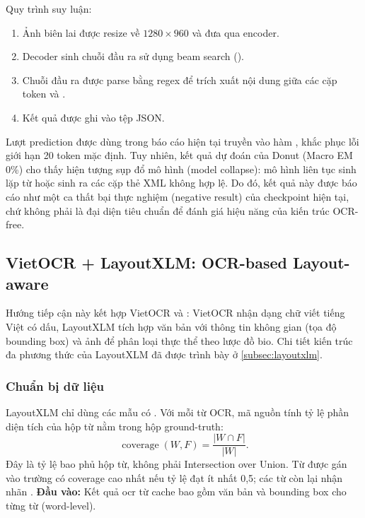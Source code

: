 Quy trình suy luận:
\begin{enumerate}
  \item Ảnh biên lai được resize về $1280 \times 960$ và đưa qua encoder.
  \item Decoder sinh chuỗi đầu ra sử dụng beam search
    ().
  \item Chuỗi đầu ra được parse bằng regex để trích xuất nội dung giữa
    các cặp token  và .
  \item Kết quả được ghi vào tệp JSON.
\end{enumerate}

\begin{warnbox}
Lượt prediction được dùng trong báo cáo hiện tại truyền  vào hàm , khắc phục lỗi giới hạn 20 token mặc định. Tuy nhiên, kết quả dự đoán của Donut (Macro EM 0\%) cho thấy hiện tượng sụp đổ mô hình (model collapse): mô hình liên tục sinh lặp từ hoặc sinh ra các cặp thẻ XML không hợp lệ. Do đó, kết quả này được báo cáo như một ca thất bại thực nghiệm (negative result) của checkpoint hiện tại, chứ không phải là đại diện tiêu chuẩn để đánh giá hiệu năng của kiến trúc OCR-free.
\end{warnbox}


\subsection{VietOCR + LayoutXLM: OCR-based Layout-aware}
\label{subsec:layoutxlm_methodology}


Hướng tiếp cận này kết hợp VietOCR và : VietOCR nhận dạng chữ viết tiếng Việt có dấu, LayoutXLM tích hợp văn bản với thông tin không gian (tọa độ bounding box) và ảnh để phân loại thực thể theo lược đồ \gls{bio}. Chi tiết kiến trúc đa phương thức của LayoutXLM đã được trình bày ở \cref{subsec:layoutxlm}.


\subsubsection{Chuẩn bị dữ liệu}
\label{subsubsec:layoutxlm_data}

LayoutXLM chỉ dùng các mẫu có . Với mỗi từ OCR, mã nguồn tính tỷ lệ phần diện tích của hộp từ nằm trong hộp ground-truth:
\begin{equation}
  \operatorname{coverage}(W,F)=\frac{|W\cap F|}{|W|}.
  \label{eq:word_coverage}
\end{equation}
Đây là tỷ lệ bao phủ hộp từ, không phải Intersection over Union. Từ được gán vào trường có coverage cao nhất nếu tỷ lệ đạt ít nhất 0,5; các từ còn lại nhận nhãn .
\textbf{Đầu vào:} Kết quả \gls{ocr} từ cache bao gồm văn bản và bounding box
cho từng từ (word-level).

